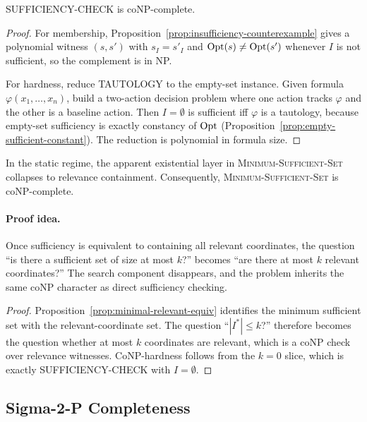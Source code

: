 \begin{theorem}\label{thm:sufficiency-conp}
SUFFICIENCY-CHECK is coNP-complete.
\end{theorem}


\begin{proof}
For membership, Proposition~\ref{prop:insufficiency-counterexample} gives a polynomial witness $(s,s')$ with $s_I=s'_I$ and $\mathrm{Opt}(s)\ne\mathrm{Opt}(s')$ whenever $I$ is not sufficient, so the complement is in NP.

For hardness, reduce TAUTOLOGY to the empty-set instance. Given formula $\varphi(x_1,\ldots,x_n)$, build a two-action decision problem where one action tracks $\varphi$ and the other is a baseline action. Then $I=\emptyset$ is sufficient iff $\varphi$ is a tautology, because empty-set sufficiency is exactly constancy of $\mathrm{Opt}$ (Proposition~\ref{prop:empty-sufficient-constant}). The reduction is polynomial in formula size.
\end{proof}

\begin{theorem}\label{thm:minsuff-conp}
In the static regime, the apparent existential layer in \textsc{Minimum-Sufficient-Set} collapses to relevance containment. Consequently, \textsc{Minimum-Sufficient-Set} is coNP-complete.
\end{theorem}


\paragraph{Proof idea.}
Once sufficiency is equivalent to containing all relevant coordinates, the question ``is there a sufficient set of size at most $k$?'' becomes ``are there at most $k$ relevant coordinates?'' The search component disappears, and the problem inherits the same coNP character as direct sufficiency checking.

\begin{proof}
Proposition~\ref{prop:minimal-relevant-equiv} identifies the minimum sufficient set with the relevant-coordinate set. The question ``$|I^*|\le k$?'' therefore becomes the question whether at most $k$ coordinates are relevant, which is a coNP check over relevance witnesses. CoNP-hardness follows from the $k=0$ slice, which is exactly SUFFICIENCY-CHECK with $I=\emptyset$.
\end{proof}

\subsection{Sigma-2-P Completeness}

